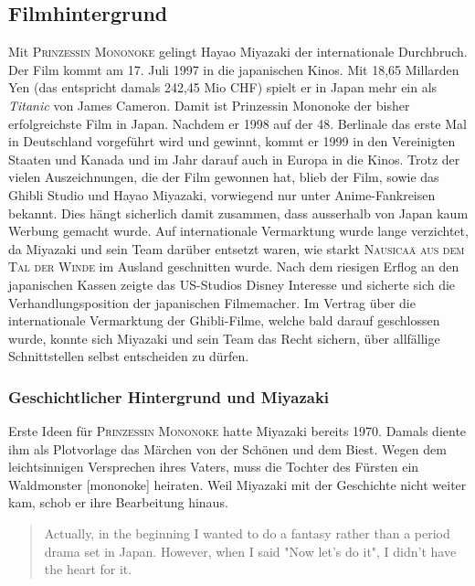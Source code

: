 \subsection{Filmhintergrund} 
Mit \textsc{Prinzessin Mononoke} gelingt Hayao Miyazaki der internationale Durchbruch. Der Film kommt am 17. Juli 1997 in die japanischen Kinos. Mit 18,65 Millarden Yen (das entspricht damals 242,45 Mio CHF) spielt er in Japan mehr ein als \emph{Titanic} von James Cameron. Damit ist Prinzessin Mononoke der bisher erfolgreichste Film in Japan. Nachdem er 1998 auf der 48. Berlinale das erste Mal in Deutschland vorgeführt wird und  gewinnt, kommt er 1999 in den Vereinigten Staaten und Kanada und im Jahr darauf auch in Europa in die Kinos. Trotz der vielen Auszeichnungen, die der Film gewonnen hat, blieb der Film, sowie das Ghibli Studio und Hayao Miyazaki, vorwiegend nur unter Anime-Fankreisen bekannt. Dies hängt sicherlich damit zusammen, dass ausserhalb von Japan kaum Werbung gemacht wurde. Auf internationale Vermarktung wurde lange verzichtet, da Miyazaki und sein Team darüber entsetzt waren, wie starkt \textsc{Nausicaä aus dem Tal der Winde} im Ausland geschnitten wurde. 
Nach dem riesigen Erflog an den japanischen Kassen zeigte das US-Studios Disney Interesse und sicherte sich die Verhandlungsposition der japanischen Filmemacher. Im Vertrag über die internationale Vermarktung der Ghibli-Filme, welche bald darauf geschlossen wurde, konnte sich Miyazaki und sein Team das Recht sichern, über allfällige Schnittstellen selbst entscheiden zu dürfen. 

\subsubsection*{Geschichtlicher Hintergrund und Miyazaki} 
Erste Ideen für \textsc{Prinzessin Mononoke} hatte Miyazaki bereits 1970. Damals diente ihm als Plotvorlage das Märchen von der Schönen und dem Biest. Wegen dem leichtsinnigen Versprechen ihres Vaters, muss die Tochter des Fürsten ein Waldmonster [mononoke] heiraten. Weil Miyazaki mit der Geschichte nicht weiter kam, schob er ihre Bearbeitung hinaus. 

\begin{quote} \glqq Actually, in the beginning I wanted to do a fantasy rather than a period drama set in Japan. However, when I said "Now let's do it", I didn't have the heart for it.\grqq {} 
\end{quote}

